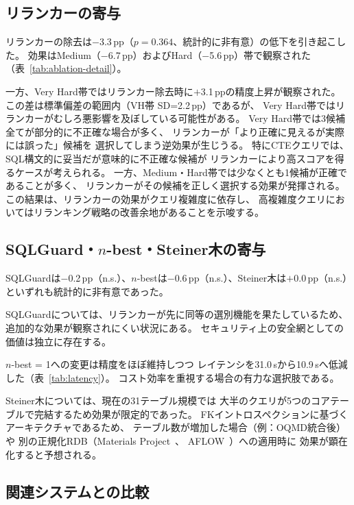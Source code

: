 \documentclass[5p,twocolumn]{elsarticle}
\begin{document}
\subsection{リランカーの寄与}
\label{sec:reranker_discussion}

リランカーの除去は$-$3.3\,pp（$p=0.364$、統計的に非有意）の低下を引き起こした。
効果はMedium（$-$6.7\,pp）およびHard（$-$5.6\,pp）帯で観察された
（表~\ref{tab:ablation-detail}）。

一方、Very Hard帯ではリランカー除去時に$+$3.1\,ppの精度上昇が観察された。
この差は標準偏差の範囲内（VH帯 SD=2.2\,pp）であるが、
Very Hard帯ではリランカーがむしろ悪影響を及ぼしている可能性がある。
Very Hard帯では3候補全てが部分的に不正確な場合が多く、
リランカーが「より正確に見えるが実際には誤った」候補を
選択してしまう逆効果が生じうる。
特にCTEクエリでは、SQL構文的に妥当だが意味的に不正確な候補が
リランカーにより高スコアを得るケースが考えられる。
一方、Medium・Hard帯では少なくとも1候補が正確であることが多く、
リランカーがその候補を正しく選択する効果が発揮される。
この結果は、リランカーの効果がクエリ複雑度に依存し、
高複雑度クエリにおいてはリランキング戦略の改善余地があることを示唆する。

\subsection{SQLGuard・$n$-best・Steiner木の寄与}

SQLGuardは$-$0.2\,pp（n.s.）、$n$-bestは$-$0.6\,pp（n.s.）、Steiner木は$+$0.0\,pp（n.s.）といずれも統計的に非有意であった。

SQLGuardについては、リランカーが先に同等の選別機能を果たしているため、
追加的な効果が観察されにくい状況にある。
セキュリティ上の安全網としての価値は独立に存在する。

$n$-best = 1への変更は精度をほぼ維持しつつ
レイテンシを31.0\,sから10.9\,sへ低減した（表~\ref{tab:latency}）。
コスト効率を重視する場合の有力な選択肢である。

Steiner木については、現在の31テーブル規模では
大半のクエリが5つのコアテーブルで完結するため効果が限定的であった。
FKイントロスペクションに基づくアーキテクチャであるため、
テーブル数が増加した場合（例：OQMD統合後）や
別の正規化RDB（Materials Project~\cite{jain2013mp}、
AFLOW~\cite{curtarolo2012aflow}）への適用時に
効果が顕在化すると予想される。

\subsection{関連システムとの比較}
\end{document}
